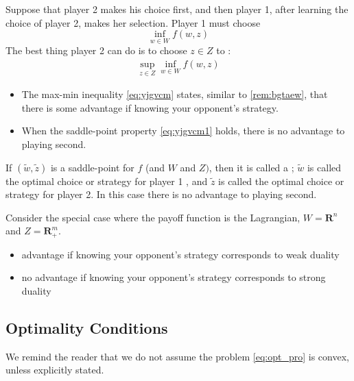 \documentclass{article}
\begin{document}
Suppose that player 2 makes his choice first, and then player 1, after learning the choice of player 2, makes her selection. Player 1
must choose $$\inf_{w\in W} f(w, z)$$
The best thing player 2 can do is to choose $z\in Z$ to :
\begin{align*}
\sup_{z \in Z} \inf_{w \in W} f(w, z)
\end{align*}

\begin{itemize}
    \item The max-min inequality \cref{eq:yjgvcm} states, similar to \cref{rem:bgtaew}, that there is some advantage if knowing your opponent's strategy.  
    \item When the saddle-point property \cref{eq:yjgvcm1} holds, there is no advantage to playing second.
\end{itemize}
If $(\tilde{w}, \tilde{z})$ is a saddle-point for $f$ (and $W$ and $Z)$, then it is called a ; $\tilde{w}$ is called the optimal choice or strategy for player 1 , and $\tilde{z}$ is called the optimal choice or strategy for player 2. In this case there is no advantage to playing second.


Consider the special case where the payoff function is the Lagrangian, $W=\mathbf{R}^{n}$ and $Z=\mathbf{R}_{+}^{m}$.
\begin{itemize}
     \item advantage if knowing your opponent's strategy  corresponds to weak duality
    \item no advantage if knowing your opponent's strategy  corresponds to strong duality
\end{itemize}




\subsection{Optimality Conditions}
We remind the reader that we do not assume the problem \cref{eq:opt_pro} is convex, unless explicitly stated.
\end{document}
